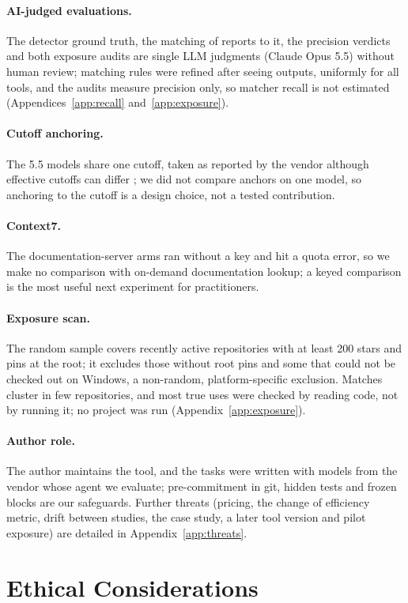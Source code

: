 \documentclass[11pt]{article}
\begin{document}
\paragraph{AI-judged evaluations.} The detector ground truth, the matching of reports to it, the precision verdicts and both exposure audits are single LLM judgments (Claude Opus 5.5) without human review; matching rules were refined after seeing outputs, uniformly for all tools, and the audits measure precision only, so matcher recall is not estimated (Appendices~\ref{app:recall} and~\ref{app:exposure}).
\paragraph{Cutoff anchoring.} The 5.5 models share one cutoff, taken as reported by the vendor although effective cutoffs can differ \citep{cheng2024dated}; we did not compare anchors on one model, so anchoring to the cutoff is a design choice, not a tested contribution.
\paragraph{Context7.} The documentation-server arms ran without a key and hit a quota error, so we make no comparison with on-demand documentation lookup; a keyed comparison is the most useful next experiment for practitioners.
\paragraph{Exposure scan.} The random sample covers recently active repositories with at least 200 stars and pins at the root; it excludes those without root pins and some that could not be checked out on Windows, a non-random, platform-specific exclusion. Matches cluster in few repositories, and most true uses were checked by reading code, not by running it; no project was run (Appendix~\ref{app:exposure}).
\paragraph{Author role.} The author maintains the tool, and the tasks were written with models from the vendor whose agent we evaluate; pre-commitment in git, hidden tests and frozen blocks are our safeguards. Further threats (pricing, the change of efficiency metric, drift between studies, the case study, a later tool version and pilot exposure) are detailed in Appendix~\ref{app:threats}.

\section*{Ethical Considerations}
\end{document}
